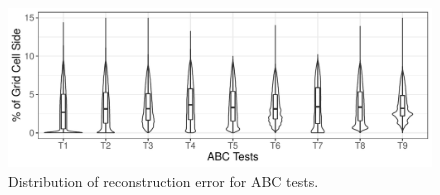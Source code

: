 \begin{figure}[!b]
\centering
\includegraphics[width=\linewidth]{Images/ABC_Tests.pdf}
\caption{Distribution of reconstruction error for ABC tests.}
\label{fig:abc_plot}
\end{figure}
